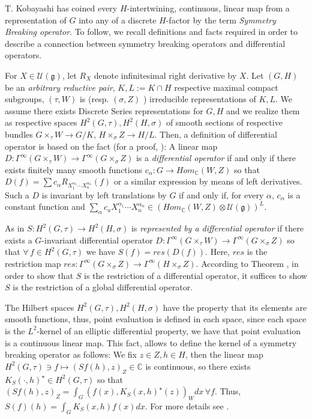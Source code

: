 \documentclass[12pt]{amsart}
\theoremstyle{definition}
\theoremstyle{remark}
\newcommand{\C}{{\mathbb C}}
\numberwithin{equation}{section}
\begin{document}
T. Kobayashi has coined every $H$-intertwining, continuous, linear map from a representation of $G$ into any of a discrete $H$-factor   by the term {\it Symmetry Breaking operator}. To follow, we recall definitions and facts required in order to describe a connection between symmetry breaking operators and differential operators.

 For $X\in \mathcal U(\mathfrak g)$, let $R_X$ denote  infinitesimal right derivative by $X$.  Let $(G,H)$ be an {\it arbitrary reductive pair}, $ K, L:=K\cap H$ respective maximal compact subgroups,  $(\tau, W)$ is (resp.    $(\sigma,Z)$ ) irreducible representations of $K,L $. We assume there exists  Discrete Series representations for $G, H$ and we realize them as respective spaces  $H^2(G,\tau), H^2(H,\sigma)$ of smooth sections of respective bundles $G\times_\tau W \rightarrow G/K$, $H\times_\sigma Z \rightarrow H/L$. Then,
 a definition of   differential operator is based on the fact (for a proof, \cite[chap V]{Wal}): A linear map $ D :\Gamma^\infty(G\times_\tau W) \rightarrow  \Gamma^\infty(G\times_\sigma Z)$ is a {\it differential operator} if and only if there exists finitely many smooth functions $c_\alpha :G\rightarrow Hom_\mathbb C(W,Z)$ so that $D(f)=\sum c_\alpha R_{X_1^{\alpha_1}\cdots X_n^{\alpha_n}}(f)$ or a similar expression by means of left derivatives. Such a $D$ is invariant by left translations by $G$ if and only if, for every $\alpha$,  $c_\alpha$ is a constant function and $\sum_\alpha c_a X_1^{\alpha_1}\cdots X_n^{\alpha_n} \in (Hom_\mathbb C(W,Z)\otimes \mathcal U(\mathfrak g))^L$.

 As in \cite{KP1}\cite[4.0.1]{OV3}    $S : H^2(G,\tau) \rightarrow H^2(H,\sigma)$ is {\it represented by a  differential operator}  if there exists a $G$-invariant differential operator   $D:   \Gamma^\infty(G\times_\tau W) \rightarrow     \Gamma^\infty(G\times_\sigma Z)$ so that $ \forall \,  f \in H^2(G,\tau)$ we have $  S(f)= res (D(f))$. Here, $res$ is the restriction map $ res: \Gamma^\infty(G\times_\sigma Z) \rightarrow \Gamma^\infty(H\times_\sigma Z)$. According to Theorem \cite[Theorem 2.5]{OV4}, in order to show that $S$ is the restriction of a differential operator,  it suffices to show $S$ is the restriction of a global differential operator.

  The Hilbert spaces $H^2(G,\tau), H^2(H,\sigma)$ have the property that its elements are smooth functions, thus, point evaluation is defined in each space, since each space is the $L^2$-kernel of an elliptic differential property, we have that point evaluation is a continuous linear map. This fact, allows to define the kernel of a symmetry breaking operator as follows: We fix $z \in Z, h \in H$, then the linear map $H^2(G,\tau)\ni f \mapsto (Sf(h),z)_Z \in \C$ is continuous, so there exists $K_S(\cdot, h)^\star \in H^2(G,\tau)$ so that $(Sf(h),z)_Z=\int_G (f(x), K_S(x, h)^\star (z))_W dx \, \forall f$. Thus, $S(f)(h)=\int_G K_S(x,h) f(x) dx$. For more details see \cite{OV2}\cite{OV4}\cite{Kob9}.
\end{document}
